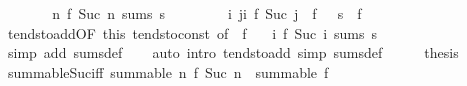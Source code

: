 \begin{isabellebody}
\ \ \isamarkupfalse%
\ \isamarkupfalse%
\ {\isachardoublequoteopen}{\isasymdots}\ {\isasymlongleftrightarrow}\ {\isacharparenleft}{\kern0pt}{\isasymlambda}n{\isachardot}{\kern0pt}\ f\ {\isacharparenleft}{\kern0pt}Suc\ n{\isacharparenright}{\kern0pt}{\isacharparenright}{\kern0pt}\ sums\ s{\isachardoublequoteclose}\isanewline
\ \ \isamarkupfalse%
\isanewline
\ \ \ \ \isamarkupfalse%
\ {\isachardoublequoteopen}{\isacharparenleft}{\kern0pt}{\isasymlambda}i{\isachardot}{\kern0pt}\ {\isacharparenleft}{\kern0pt}{\isasymSum}j{\isacharless}{\kern0pt}i{\isachardot}{\kern0pt}\ f\ {\isacharparenleft}{\kern0pt}Suc\ j{\isacharparenright}{\kern0pt}{\isacharparenright}{\kern0pt}\ {\isacharplus}{\kern0pt}\ f\ {}{\isacharparenright}{\kern0pt}\ {\isasymlonglonglongrightarrow}\ s\ {\isacharplus}{\kern0pt}\ f\ {}{\isachardoublequoteclose}\isanewline
\ \ \ \ \isamarkupfalse%
\ tendsto{\isacharunderscore}{\kern0pt}add{\isacharbrackleft}{\kern0pt}OF\ this\ tendsto{\isacharunderscore}{\kern0pt}const{\isacharcomma}{\kern0pt}\ of\ {\isachardoublequoteopen}{\isacharminus}{\kern0pt}\ f\ {}{\isachardoublequoteclose}{\isacharbrackright}{\kern0pt}\ \isamarkupfalse%
\ {\isachardoublequoteopen}{\isacharparenleft}{\kern0pt}{\isasymlambda}i{\isachardot}{\kern0pt}\ f\ {\isacharparenleft}{\kern0pt}Suc\ i{\isacharparenright}{\kern0pt}{\isacharparenright}{\kern0pt}\ sums\ s{\isachardoublequoteclose}\isanewline
\ \ \ \ \ \ \isamarkupfalse%
\ {\isacharparenleft}{\kern0pt}simp\ add{\isacharcolon}{\kern0pt}\ sums{\isacharunderscore}{\kern0pt}def{\isacharparenright}{\kern0pt}\isanewline
\ \ \isamarkupfalse%
\ {\isacharparenleft}{\kern0pt}auto\ intro{\isacharcolon}{\kern0pt}\ tendsto{\isacharunderscore}{\kern0pt}add\ simp{\isacharcolon}{\kern0pt}\ sums{\isacharunderscore}{\kern0pt}def{\isacharparenright}{\kern0pt}\isanewline
\ \ \isamarkupfalse%
\ \isamarkupfalse%
\ {\isacharquery}{\kern0pt}thesis\ \isacommand{{\isachardot}{\kern0pt}{\isachardot}{\kern0pt}}\isamarkupfalse%
\isanewline
{}\isamarkupfalse%
%
\endisatagproof
{\isafoldproof}%
%
\isadelimproof
\isanewline
%
\endisadelimproof
\isanewline
{}\isamarkupfalse%
\ summable{\isacharunderscore}{\kern0pt}Suc{\isacharunderscore}{\kern0pt}iff{\isacharcolon}{\kern0pt}\ {\isachardoublequoteopen}summable\ {\isacharparenleft}{\kern0pt}{\isasymlambda}n{\isachardot}{\kern0pt}\ f\ {\isacharparenleft}{\kern0pt}Suc\ n{\isacharparenright}{\kern0pt}{\isacharparenright}{\kern0pt}\ {\isacharequal}{\kern0pt}\ summable\ f{\isachardoublequoteclose}\isanewline

\end{isabellebody}
